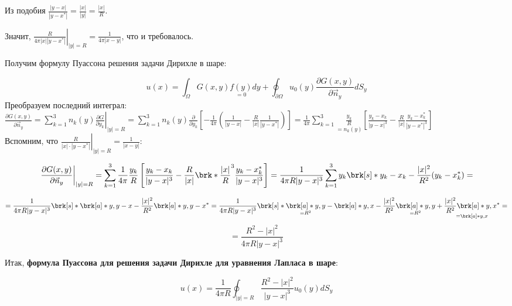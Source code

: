 Из подобия $\frac{|y-x|}{|y-x^*|} = \frac{|x|}{|y|} = \frac{|x|}{R}$.

Значит, $\left.\frac{R}{4 \pi |x| |y-x^*|} \right|_{|y|=R} = \frac{1}{4 \pi |x-y|}$, что и требовалось.


Получим формулу Пуассона решения задачи Дирихле в шаре:

$$u(x) = \int_{\Omega}{G(x,y) \underset{=0}{f(y)} dy} +
\oint_{\partial \Omega}{u_0(y) \frac{\partial G(x,y)}
{\partial \vec{n}_y}dS_y}
$$
Преобразуем последний интеграл:\\

$
\frac{\partial G(x,y)}{\partial \vec{n}_y}=
\sum_{k=1}^{3}{n_k(y) \left. \frac{\partial G}{\partial y_k} \right|_{|y|=R}}=
\sum_{k=1}^{3}{n_k(y)\frac{\partial}{\partial y_k}\left[
-\frac{1}{4\pi}\left(\frac{1}{|y-x|}-\frac{R}{|x|}\frac{1}{|y-x^*|}\right)
\right]} = \frac{1}{4 \pi}  \sum_{k=1}^{3}\underset{=n_k(y)}{\frac{y_k}{R}}\left[ \frac{y_k-x_k}{|y-x|^3} - \frac{R}{|x|}  \frac{y_k-x_k^*}{|y-x^*|^3} \right]
$\\

Вспомним, что $\left.\frac{R}{|x|\cdot|y-x^*|}\right|_{|y|=R} =
\frac{1}{|x-y|}$:

$$
\left. \frac{\partial G(x,y)}{\partial \vec{n}_y} \right|_{|y|=R} 
=
\sum_{k=1}^{3}{\frac{1}{4 \pi} \frac{y_k}{R}
\left[ \frac{y_k-x_k}{|y-x|^3} -\frac{R}{|x|}\brk*{\frac{|x|}{R}}^3
\frac{y_k - x_k^*}{|y-x|^3} \right] }
=
\frac{1}{4 \pi R |y-x|^3} \sum_{k=1}^{3}{y_k \brk[s]*{y_k-x_k-\frac{|x|^2}{R^2}(y_k - x_k^*)}}
=
$$

$$
=
\frac{1}{4 \pi R |y-x|^3} \brk[s]*{\brk[a]*{y,y-x} - \frac{|x|^2}{R^2}
\brk[a]*{y,y-x^*}}
=
\frac{1}{4 \pi R |y-x|^3} \brk[s]*{\underset{=R^2}{\brk[a]*{y,y}} - \brk[a]*{y,x}
-\frac{|x|^2}{R^2}\underset{=R^2}{\brk[a]*{y,y}}+ \underset{=\brk[a]*{y,x}}{\frac{|x|^2}{R^2} \brk[a]*{y,x^*}}  }
= $$ 
$$
=\frac{R^2 - |x|^2}{4 \pi R |y-x|^3}
$$

Итак, \textbf{формула Пуассона для решения задачи Дирихле для уравнения Лапласа в шаре}:

$$
u(x) = \frac{1}{4 \pi R} \oint_{|y|=R}{\frac{R^2-|x|^2}{|y-x|^3}u_0(y) dS_y}
$$


